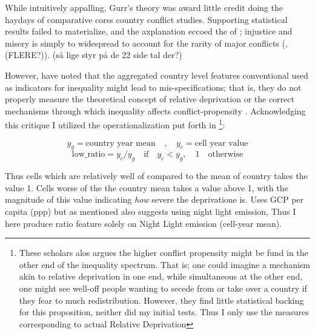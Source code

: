 \documentclass[a4paper]{article}
\begin{document}
While intuitively appalling, Gurr's theory was award little credit doing the haydays of comparative corss country conflict studies. Supporting statistical results failed to materialize, and the axplanation eccoed the of \cite[11]{Skocpol_1979}; injustice and misery is simply to widespread to account for the rarity of major conflicts (\citealp[p. 22]{Collier_Hoeffler_1998},  \citealp[p. 22]{Collier_Hoeffler_2004} \citealp[p. 44]{Fearon_Laitin_2003}(FLERE?)). (så lige styr på de 22 side tal der?)

However, \cite{Cederman_Gleditsch_2009,Cederman_Gleditsch_Buhaug_2013} have noted that the aggregated country level features conventional used as indicators for inequality might lead to mis-specifications; that is, they do not properly measure the theoretical concept of relative deprivation or the correct mechanisms through which inequality affects conflict-propensity \citep[XX]{Cederman_Gleditsch_Buhaug_2013}. Acknowledging this critique I utilized the operationalization put forth in \cite[p. 104-105]{Cederman_Gleditsch_Buhaug_2013}\footnote{These scholars alos argues the higher conflict propensity might be fund in the other end of the inequality spectrum. That is; one could imagine a mechanism akin to relative deprivation in one end, while simultaneous at the other end, one might see well-off people wanting to secede from or take over a country if they fear to much redistribution. However, they find little statistical backing for this proposition, neither did my initial tests. Thus I only use the measures corresponding to actual Relative Deprivation}:\par

$$y_g = \textrm{country year mean}\quad ,\quad  y_c = \textrm{cell year value}$$
$$\textrm{low\_ratio} = y_c/y_g  \quad \textrm{if} \quad y_c < y_g, \quad 1 \quad \textrm{otherwise}$$

Thus cells which are relatively well of compared to the mean of country takes the value 1. Cells worse of the the country mean takes a value above 1, with the magnitude of this value indicating \emph{how} severe the deprivatione is. \cite{Cederman_Gleditsch_Buhaug_2013} Uses GCP per capita (ppp) but as mentioned also suggests using night light emission, Thus I here produce ratio feature solely on Night Light emission (cell-year mean).\par
\end{document}
